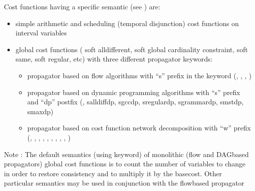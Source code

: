 \documentclass[letterpaper,10pt,openany,oneside,english]{sphinxmanual}
\begin{document}
\begin{fulllineitems}
\begin{itemize}
\end{itemize}

Cost functions having a specific semantic (see {\hyperref[\detokenize{formats/wcspformat:group__wcspformat}]{}}) are:\begin{itemize}
\item {} 
\sphinxAtStartPar
simple arithmetic and scheduling (temporal disjunction) cost functions on interval variables

\item {} 
\sphinxAtStartPar
global cost functions ( soft alldifferent, soft global cardinality constraint, soft same, soft regular, etc) with three different propagator keywords:\begin{itemize}
\item {} 
\sphinxAtStartPar
{} propagator based on flow algorithms with “s” prefix in the keyword (, , , )

\item {} 
\sphinxAtStartPar
{} propagator based on dynamic programming algorithms with “s” prefix and “dp” postfix (, salldiffdp, sgccdp, sregulardp, sgrammardp, smstdp, smaxdp)

\item {} 
\sphinxAtStartPar
{} propagator based on cost function network decomposition with “w” prefix (, , , , , , , , , )

\end{itemize}


\end{itemize}

Note : The default semantics (using  keyword) of monolithic (flow and DAG\sphinxhyphen{}based propagators) global cost functions is to count the number of variables to change in order to restore consistency and to multiply it by the basecost. Other particular semantics may be used in conjunction with the flow\sphinxhyphen{}based propagator


\end{fulllineitems}
\end{document}
